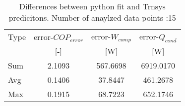 \documentclass[english]{SPFShortReport}
\begin{document}
\begin{table}[!ht]
\begin{small}
\caption{Differences between python fit and Trnsys predicitons. Number of anaylzed data points :15}
\begin{center}
\resizebox{8cm}{!} 
{
\begin{tabular}{l | c c c } 
\hline
\hline
Type &error-$COP_{error}$ &error-$W_{comp}$ &error-$Q_{cond}$ \\ 
 &[-] &[W] &[W]\\ 
\hline
\hline
Sum &   2.1093 & 567.6698 & 6919.0170 \\ 
Avg &   0.1406 &  37.8447 & 461.2678 \\ 
Max &   0.1915 &  68.7223 & 652.1746 \\ 
\hline
\hline
\hline
\end{tabular}
}
\label{DiffTrnsysPython}
\end{center}
\end{small}
\end{table}
\end{document}
